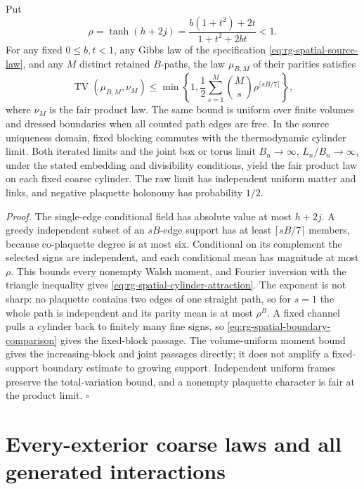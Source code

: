 Put
\begin{equation}
 \rho=\tanh(h+2j)=\frac{b(1+t^2)+2t}{1+t^2+2bt}<1.
 \label{eq:rg-spatial-rho}
\end{equation}
For any fixed \(0\le b,t<1\), any Gibbs law of the specification
\cref{eq:rg-spatial-source-law}, and any \(M\) distinct retained
\(B\)-paths, the law \(\mu_{B,M}\) of their parities satisfies
\begin{equation}
 \operatorname{TV}(\mu_{B,M},\nu_M)
 \le\min\left\{1,\frac12\sum_{s=1}^M \binom Ms
              \rho^{\lceil sB/7\rceil}\right\},
 \label{eq:rg-spatial-cylinder-attraction}
\end{equation}
where \(\nu_M\) is the fair product law. The same bound is uniform over
finite volumes and dressed boundaries when all counted path edges are free.
In the source uniqueness domain, fixed blocking commutes with the
thermodynamic cylinder limit. Both iterated limits and the joint box or
torus limit \(B_n\to\infty\), \(L_n/B_n\to\infty\), under the stated
embedding and divisibility conditions, yield the fair product law on each
fixed coarse cylinder. The raw limit has independent uniform matter and
links, and negative plaquette holonomy has probability \(1/2\).

\noindent\emph{Proof.}
The single-edge conditional field has absolute value at most \(h+2j\). A
greedy independent subset of an \(sB\)-edge support has at least
\(\lceil sB/7\rceil\) members, because co-plaquette degree is at most six.
Conditional on its complement the selected signs are independent, and each
conditional mean has magnitude at most \(\rho\). This bounds every nonempty
Walsh moment, and Fourier inversion with the triangle inequality gives
\cref{eq:rg-spatial-cylinder-attraction}. The exponent is not sharp: no
plaquette contains two edges of one straight path, so for \(s=1\) the whole
path is independent and its parity mean is at most \(\rho^B\). A fixed
channel pulls a cylinder back to finitely many fine signs, so
\cref{eq:rg-spatial-boundary-comparison} gives the fixed-block passage. The
volume-uniform moment bound gives the increasing-block and joint passages
directly; it does not amplify a fixed-support boundary estimate to growing
support. Independent uniform frames preserve the total-variation bound,
and a nonempty plaquette character is fair at the product limit.
\hfill\(\square\)

\section{Every-exterior coarse laws and all generated interactions}
\label{sec:rg-spatial-generated}


